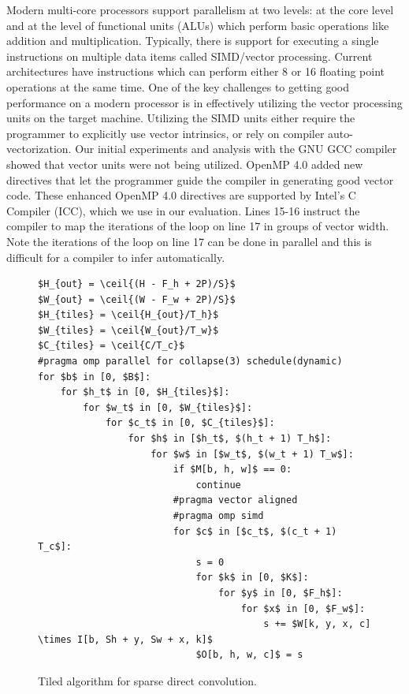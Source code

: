 \documentclass{article}
\begin{document}
Modern multi-core processors support parallelism at two levels: at the core
level and at the level of functional units (ALUs) which perform basic
operations like addition and multiplication. Typically, there is support for
executing a single instructions on multiple data items called SIMD/vector
processing.  Current architectures have instructions which can perform either 8
or 16 floating point operations at the same time. One of the key challenges to
getting good performance on a modern processor is in effectively utilizing the
vector processing units on the target machine. Utilizing the SIMD units either
require the programmer to explicitly use vector intrinsics, or rely on compiler
auto-vectorization. Our initial experiments and analysis with the GNU GCC compiler
showed that vector units were not being utilized. OpenMP 4.0 added new directives
that let the programmer guide the compiler in generating good vector code. These
enhanced OpenMP 4.0 directives are supported by Intel's C Compiler (ICC), which
we use in our evaluation. Lines 15-16 instruct the compiler to map the iterations 
of the loop on line 17 in groups of vector width. Note the iterations of the loop 
on line 17 can be done in parallel and this is difficult for a compiler to infer
automatically.

\begin{figure}
\begin{lstlisting}[mathescape]
$H_{out} = \ceil{(H - F_h + 2P)/S}$
$W_{out} = \ceil{(W - F_w + 2P)/S}$
$H_{tiles} = \ceil{H_{out}/T_h}$
$W_{tiles} = \ceil{W_{out}/T_w}$
$C_{tiles} = \ceil{C/T_c}$
#pragma omp parallel for collapse(3) schedule(dynamic)
for $b$ in [0, $B$]:
    for $h_t$ in [0, $H_{tiles}$]:
        for $w_t$ in [0, $W_{tiles}$]:
            for $c_t$ in [0, $C_{tiles}$]:
                for $h$ in [$h_t$, $(h_t + 1) T_h$]:
                    for $w$ in [$w_t$, $(w_t + 1) T_w$]:
                        if $M[b, h, w]$ == 0:
                            continue
                        #pragma vector aligned
                        #pragma omp simd
                        for $c$ in [$c_t$, $(c_t + 1) T_c$]:
                            s = 0
                            for $k$ in [0, $K$]:
                                for $y$ in [0, $F_h$]:
                                    for $x$ in [0, $F_w$]:
                                        s += $W[k, y, x, c] \times I[b, Sh + y, Sw + x, k]$
                            $O[b, h, w, c]$ = s

\end{lstlisting}
    \caption{Tiled algorithm for sparse direct convolution.}
    \label{fig:conv_algo}
\end{figure}
\end{document}
